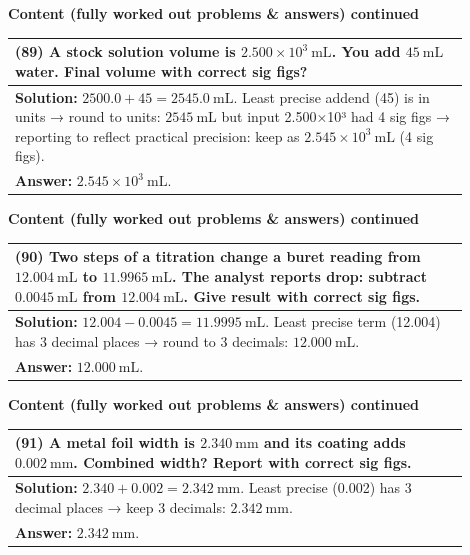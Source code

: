 \documentclass{article}
\begin{document}
\noindent
{\large \textbf{Content (fully worked out problems \& answers) continued}} \\[0.2em]
\begin{tabular}{|p{0.9\linewidth}|}
\hline
\vspace{0.2cm}
\textbf{(89)} A stock solution volume is $2.500\times10^{3}~\text{mL}$. You add $45~\text{mL}$ water. Final volume with correct sig figs? \\
\hline
\vspace{0.2cm}
\textbf{Solution:} $2500.0+45=2545.0~\text{mL}$. Least precise addend (45) is in units → round to units: $2545~\text{mL}$ but input 2.500×10³ had 4 sig figs → reporting to reflect practical precision: keep as $2.545\times10^{3}~\text{mL}$ (4 sig figs). \\
\textbf{Answer:} $2.545\times10^{3}~\text{mL}$. \\
\hline
\end{tabular}
\newpage

\noindent
{\large \textbf{Content (fully worked out problems \& answers) continued}} \\[0.2em]
\begin{tabular}{|p{0.9\linewidth}|}
\hline
\vspace{0.2cm}
\textbf{(90)} Two steps of a titration change a buret reading from $12.004~\text{mL}$ to $11.9965~\text{mL}$. The analyst reports drop: subtract $0.0045~\text{mL}$ from $12.004~\text{mL}$. Give result with correct sig figs. \\
\hline \textbf{Solution:} $12.004-0.0045=11.9995~\text{mL}$. Least precise term (12.004) has 3 decimal places → round to 3 decimals: $12.000~\text{mL}$. \\
\textbf{Answer:} $12.000~\text{mL}$. \\
\hline
\end{tabular}
\newpage

\noindent
{\large \textbf{Content (fully worked out problems \& answers) continued}} \\[0.2em]
\begin{tabular}{|p{0.9\linewidth}|}
\hline
\vspace{0.2cm}
\textbf{(91)} A metal foil width is $2.340~\text{mm}$ and its coating adds $0.002~\text{mm}$. Combined width? Report with correct sig figs. \\
\hline \textbf{Solution:} $2.340+0.002=2.342~\text{mm}$. Least precise (0.002) has 3 decimal places → keep 3 decimals: $2.342~\text{mm}$. \\
\textbf{Answer:} $2.342~\text{mm}$. \\
\hline
\end{tabular}
\newpage
\end{document}
